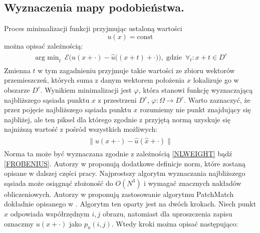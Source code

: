 \documentclass[12pt, twoside, openany]{report}
\theoremstyle{definition}
\begin{document}
\subsection{Wyznaczenia mapy podobieństwa.}
Proces minimalizacji funkcji przyjmując ustaloną wartości
\begin{equation}
u(x) = \text{const}
\end{equation}
można opisać zależnością:
\begin{align}
\begin{aligned}
\mathop{\operatorname{arg \ min}}_{t} \ \mathcal{E}\biggl( u(x+\cdot) - {\hat{u}}\bigl((x+t)+\cdot\bigr)\biggr),\operatorname{gdzie} \ \forall_t : x+t \in D^c
\label{minNNF}
\end{aligned}
\end{align}
Zmienna $t$ w tym zagadnieniu przyjmuje takie wartości ze zbioru wektorów przemieszczeń, których suma z danym wektorem położenia $x$ lokalizuje go w obszarze $D^c$. Wynikiem minimalizacji jest $\varphi$, która stanowi funkcję wyznaczającą najbliższego sąsiada punktu $x$ z przestrzeni $D^c$, $\varphi :\Omega \rightarrow D^c$. Warto zaznaczyć, że przez pojęcie najbliższego sąsiada punktu $x$ rozumiemy nie punkt znajdujący się najbliżej, ale ten piksel dla którego zgodnie z przyjętą normą uzyskuje się najniższą wartość z pośród wszystkich możliwych:
\begin{align}
\begin{aligned}
\big\| u(x + \cdot) - \hat{u}(\hat{x}+\cdot) \big\| 
\label{normNNF}
\end{aligned}
\end{align}
Norma ta może być wyznaczana zgodnie z zależnością \eqref{NLWEIGHT} bądź \eqref{FROBENIUS}. Autorzy w \cite{MathematicalModelsforNLTextureInpainting} proponują dodatkowe definicje norm, które zostaną opisane w dalszej części pracy. Najprostszy algorytm wyznaczania najbliższego sąsiada może osiągnąć złożoność do $O(N^3)$ i wymagać znacznych nakładów obliczeniowych. Autorzy w \cite{arias2011variational} proponują zastosowanie algorytmu PatchMatch dokładnie opisanego w \cite{barnes2009patchmatch}. Algorytm ten oparty jest na dwóch krokach. Niech punkt $x$ odpowiada współrzędnym $i, j$ obrazu, natomiast dla uproszczenia zapisu oznaczmy $u(x+\cdot)$ jako $p_u(i,j)$. Wtedy kroki można opisać następująco:
\end{document}
